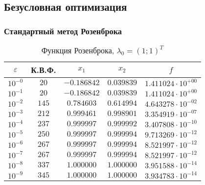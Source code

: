\documentclass[a4paper,12pt,notitlepage,pdftex,headsepline]{scrartcl}
\begin{document}
  \subsection{Безусловная оптимизация}
    \subsubsection{Стандартный метод Розенброка}
        \begin{table}[ht]
          \centering
          \caption{Функция Розенброка, $\lambda_0 = (1; 1)^T$}
          \begin{tabular}{|c|c|c|c|c|}
            \hline
            $\varepsilon$ & К.В.Ф. & $x_1$ & $x_2$ & $f$\\
            \hline
             $10^{-0}$ & $20$ & $-0.186842$ & $0.039839$ & $1.411024\cdot 10^{+00}$\\
             $10^{-1}$ & $20$ & $-0.186842$ & $0.039839$ & $1.411024\cdot 10^{+00}$\\
             $10^{-2}$ & $145$ & $0.784603$ & $0.614994$ & $4.643278\cdot 10^{-02}$\\
             $10^{-3}$ & $212$ & $0.999461$ & $0.998901$ & $3.354919\cdot 10^{-07}$\\
             $10^{-4}$ & $237$ & $0.999997$ & $0.999992$ & $3.407808\cdot 10^{-10}$\\
             $10^{-5}$ & $250$ & $0.999997$ & $0.999994$ & $9.713269\cdot 10^{-12}$\\
             $10^{-6}$ & $267$ & $0.999997$ & $0.999994$ & $8.521997\cdot 10^{-12}$\\
             $10^{-7}$ & $267$ & $0.999997$ & $0.999994$ & $8.521997\cdot 10^{-12}$\\
             $10^{-8}$ & $337$ & $1.000000$ & $1.000000$ & $3.951588\cdot 10^{-14}$\\
             $10^{-9}$ & $345$ & $1.000000$ & $1.000000$ & $3.934783\cdot 10^{-14}$\\
            \hline
          \end{tabular}
        \end{table}
\end{document}
